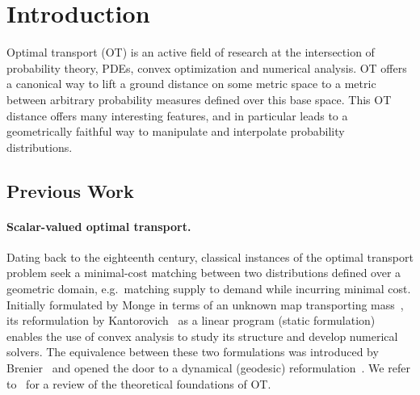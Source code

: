 
\section{Introduction}
\label{sec-intro}


Optimal transport (OT) is an active field of research at the intersection of probability theory, PDEs, convex optimization and numerical analysis. 
%
OT offers a canonical way to lift a ground distance on some metric space to a metric between arbitrary probability measures defined over this base space. This OT distance offers many interesting  features, and in particular leads to a geometrically faithful way to manipulate and interpolate probability distributions.




\subsection{Previous Work}

\paragraph{Scalar-valued optimal transport.}

Dating back to the eighteenth century, classical instances of the optimal transport problem seek a minimal-cost matching between two distributions defined over a geometric domain, e.g.\ matching supply to demand while incurring minimal cost. 
Initially formulated by Monge in terms of an unknown map transporting mass~\cite{Monge1781}, its reformulation by Kantorovich~\cite{Kantorovich42} as a linear program (static formulation) enables the use of convex analysis to study its structure and develop numerical solvers. 
% 
The equivalence between these two formulations was introduced by Brenier~\cite{Brenier91} and opened the door to a dynamical (geodesic) reformulation~\cite{benamou2000computational}. We refer to~\cite{santambrogio2015optimal} for a review of the theoretical foundations of OT. 
%

